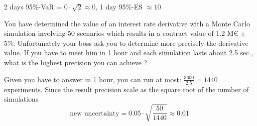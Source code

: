 \documentclass[12pt,a4paper]{exam}
\begin{document}
\begin{questions}
\begin{solution}
2 days 95\%-VaR = $0 \cdot \sqrt{2} \approx 0$, 1 day 95\%-ES $\approx 10$
\end{solution}

\question You have determined the value of an interest rate derivative with a Monte Carlo simulation involving 50 scenarios which results in a contract value of 1.2 M€ $\pm$ 5\%. Unfortunately your boss ask you to determine more precisely the derivative value. If you have to meet him in 1 hour and each simulation lasts about 2.5 sec., what is the highest precision you can achieve ?
\makeemptybox{1.5 cm}

\begin{solution}
Given you have to answer in 1 hour, you can run at most: $\frac{3600}{2.5}=1440$ experiments. Since the result precision scale as the square root of the number of simulations
\begin{equation*}
\textrm{new uncertainty} = 0.05 \cdot \sqrt{\frac{50}{1440}} \approx 0.01
\end{equation*}
\end{solution}

\end{questions}
\end{document}
